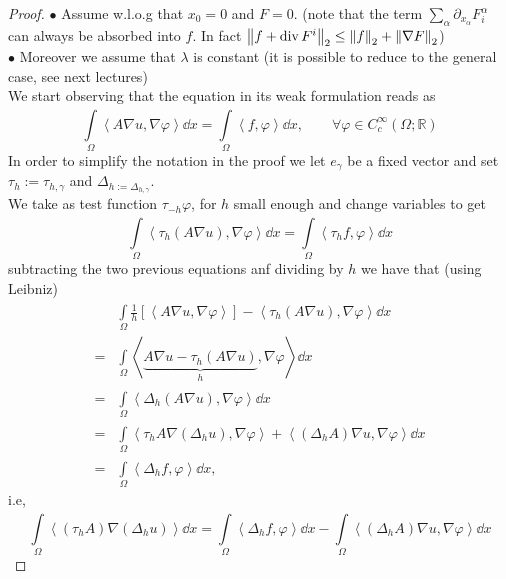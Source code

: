 \begin{proof}
	\( \bullet \)  Assume w.l.o.g that \( x_{0}=0 \) and \( F=0 \). (note that the term \( \sum_{\alpha }^{}\partial_{x_{\alpha }}F_{i}^{\alpha } \) can always be absorbed into \( f \). In fact \( \left\lVert f+ \operatorname{div}F^{i}\right\rVert_{2}\leq \left\lVert f\right\rVert_{2}+\left\lVert\nabla F\right\rVert_{2} \))\\
	\( \bullet \)  Moreover we assume that \( \lambda \) is constant (it is possible to reduce to the general case, see next lectures) \\
	We start observing that the equation in its weak formulation reads as
	\[ \int\limits_{\Omega}^{} \left\langle A \nabla u, \nabla \varphi  \right\rangle  \dd{x} = \int\limits_{\Omega}^{} \left\langle f,\varphi  \right\rangle  \dd{x}, \qquad \forall  \varphi \in  C_{c}^{\infty }(\Omega ; \mathbb{R}) \]
	In order to simplify the notation in the proof we let \( e_{\gamma } \) be a fixed vector and set \( \tau _{h}:= \tau _{h, \gamma  } \) and \( \Delta _{h := \Delta _{h, \gamma }} \).\\
	We take as test function \( \tau _{-h}\varphi  \), for \( h \) small enough and change variables to get
	\[ \int\limits_{\Omega}^{} \left\langle \tau _{h}(A \nabla u), \nabla \varphi  \right\rangle  \dd{x} = \int\limits_{\Omega}^{} \left\langle \tau _{h}f, \varphi  \right\rangle  \dd{x} \]
	subtracting the two previous equations anf dividing by \( h \) we have that (using Leibniz)
	\begin{align}
		  & \int\limits_{\Omega}^{} \frac{1}{h} \left[ \left\langle A \nabla u, \nabla \varphi  \right\rangle  \right]- \left\langle \tau _{h}(A \nabla u), \nabla \varphi  \right\rangle \dd{x} \\
		= & \int\limits_{\Omega}^{} \left\langle \underbrace{A \nabla u - \tau _{h}(A \nabla u)}_{h}, \nabla \varphi  \right\rangle  \dd{x}                                                      \\
		= & \int\limits_{\Omega}^{} \left\langle \Delta _{h}(A \nabla u), \nabla \varphi  \right\rangle  \dd{x}                                                                                  \\
		= & \int\limits_{\Omega}^{} \left\langle \tau _{h} A \nabla (\Delta _{h} u), \nabla \varphi \right\rangle  + \left\langle (\Delta _{h}A) \nabla u, \nabla \varphi  \right\rangle \dd{x}  \\
		= & \int\limits_{\Omega}^{} \left\langle \Delta _{h}f, \varphi  \right\rangle  \dd{x},
	\end{align}
	i.e,
	\[ \int\limits_{\Omega}^{} \left\langle (\tau _{h}A) \nabla (\Delta _{h}u)  \right\rangle  \dd{x} = \int\limits_{\Omega}^{} \left\langle \Delta _{h} f, \varphi  \right\rangle  \dd{x} - \int\limits_{\Omega}^{} \left\langle (\Delta _{h}A) \nabla u, \nabla \varphi \right\rangle  \dd{x} \]

\end{proof}
